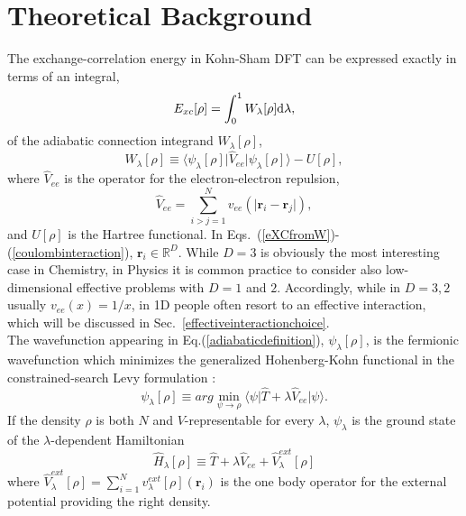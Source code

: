 \documentclass[aps,pra,twocolumn,superscriptaddress]{revtex4}
\begin{document}

\section{Theoretical Background}
\label{sec:theor.back.}
The exchange-correlation energy in Kohn-Sham DFT can be expressed exactly in terms of an integral, 
\begin{equation}\label{eXCfromW}
E_{xc}[\rho]=\int_0^1 W_{\lambda}[\rho]\text{\rm{d}}\lambda,
\end{equation}of the adiabatic connection integrand $W_{\lambda}[\rho]$,
\begin{equation}\label{adiabaticdefinition}
W_{\lambda}[\rho]\equiv\langle\psi_{\lambda}[\rho]\vert\hat{V}_{ee}\vert\psi_{\lambda}[\rho]\rangle-U[\rho],
\end{equation}
where $\hat{V}_{ee}$ is the operator for the electron-electron repulsion, 
\begin{equation}\label{coulombinteraction}
\hat{V}_{ee}=\sum_{i>j=1}^Nv_{ee}(\vert\textbf{r}_i-\textbf{r}_j\vert),
\end{equation}
and $U[\rho]$ is the Hartree functional. In Eqs.~(\ref{eXCfromW})-(\ref{coulombinteraction}), $\textbf{r}_i\in\mathbb{R}^D$. While $D=3$ is obviously the most interesting case in Chemistry, in Physics it is common practice to consider also low-dimensional effective problems with $D=1$ and $2$. Accordingly, while in $D=3,2$ usually $v_{ee}(x)=1/x$, in 1D people often resort to an effective interaction, which will be discussed in Sec.~\ref{effectiveinteractionchoice}.
\\The wavefunction appearing in Eq.(\ref{adiabaticdefinition}), $\psi_{\lambda}[\rho]$, is the fermionic wavefunction which minimizes the generalized Hohenberg-Kohn functional in the constrained-search Levy formulation \cite{Lev-PNAS-79}:
\begin{equation}\label{definitionpsilambda}
\psi_{\lambda}[\rho]\equiv arg\min_{\psi\rightarrow\rho}\langle\psi\vert\hat{T}+\lambda\hat{V}_{ee}\vert\psi\rangle.
\end{equation}
If the density $\rho$ is both $N$ and $V$-representable for every $\lambda$, $\psi_{\lambda}$ is the ground state of the $\lambda$-dependent Hamiltonian \begin{equation}\label{lambdahamiltonian}
\hat{H}_{\lambda}[\rho]\equiv\hat{T}+\lambda\hat{V}_{ee}+\hat{V}^{ext}_{\lambda}[\rho]
\end{equation} where $\hat{V}^{ext}_{\lambda}[\rho]=\sum_{i=1}^N v_{\lambda}^{ext}[\rho](\textbf{r}_i)$ is the one body operator for the external potential providing the right density.
\end{document}
